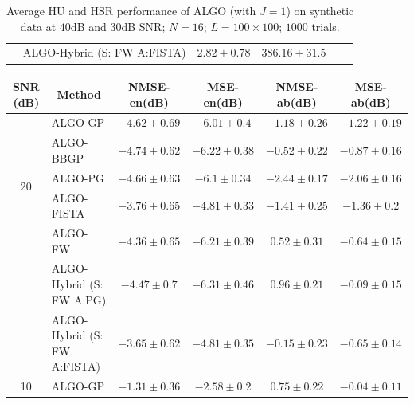 \begin{table}[h]
\begin{adjustbox}{max width=\textwidth}
\begin{tabular}{|c|l|c|c|c|c|}
                    & ALGO-Hybrid (S: FW A:FISTA)& $2.82     \pm 0.78$   & $386.16   \pm 31.5$    \tabularnewline \cline{1-4}
\end{tabular}
\end{adjustbox}
\caption{Average HU and HSR performance of ALGO (with $J=1$) on synthetic
         data at $40$dB and $30$dB SNR; $N = 16$; $L = 100 \times 100$; $1000$
         trials.}
\label{table:results_full_MO16_SNR4030dB_J1}
\end{table}

\newpage

\begin{table}[h]
\centering
\begin{adjustbox}{max width=\textwidth}
\begin{tabular}{|c|l|c|c|c|c|}
\hline
SNR (dB)            & \multicolumn{1}{c|}{Method}       & NMSE-en(dB)         & MSE-en(dB)          & NMSE-ab(dB)         & MSE-ab(dB)          \tabularnewline \hline
\multirow{5}{*}{20} & ALGO-GP                    & $-4.62    \pm 0.69$ & $-6.01    \pm 0.4$  & $-1.18    \pm 0.26$ & $-1.22    \pm 0.19$ \tabularnewline
                    & ALGO-BBGP                  & $-4.74    \pm 0.62$ & $-6.22    \pm 0.38$ & $-0.52    \pm 0.22$ & $-0.87    \pm 0.16$ \tabularnewline
                    & ALGO-PG                    & $-4.66    \pm 0.63$ & $-6.1     \pm 0.34$ & $-2.44    \pm 0.17$ & $-2.06    \pm 0.16$ \tabularnewline
                    & ALGO-FISTA                 & $-3.76    \pm 0.65$ & $-4.81    \pm 0.33$ & $-1.41    \pm 0.25$ & $-1.36    \pm 0.2$  \tabularnewline
                    & ALGO-FW                    & $-4.36    \pm 0.65$ & $-6.21    \pm 0.39$ & $0.52     \pm 0.31$ & $-0.64    \pm 0.15$ \tabularnewline
                    & ALGO-Hybrid (S: FW A:PG)   & $-4.47    \pm 0.7$  & $-6.31    \pm 0.46$ & $0.96     \pm 0.21$ & $-0.09    \pm 0.15$ \tabularnewline
                    & ALGO-Hybrid (S: FW A:FISTA)& $-3.65    \pm 0.62$ & $-4.81    \pm 0.35$ & $-0.15    \pm 0.23$ & $-0.65    \pm 0.14$ \tabularnewline \hline
\multirow{7}{*}{10} & ALGO-GP                    & $-1.31    \pm 0.36$ & $-2.58    \pm 0.2$  & $0.75     \pm 0.22$ & $-0.04    \pm 0.11$ \tabularnewline

\end{tabular}
\end{adjustbox}
\end{table}
